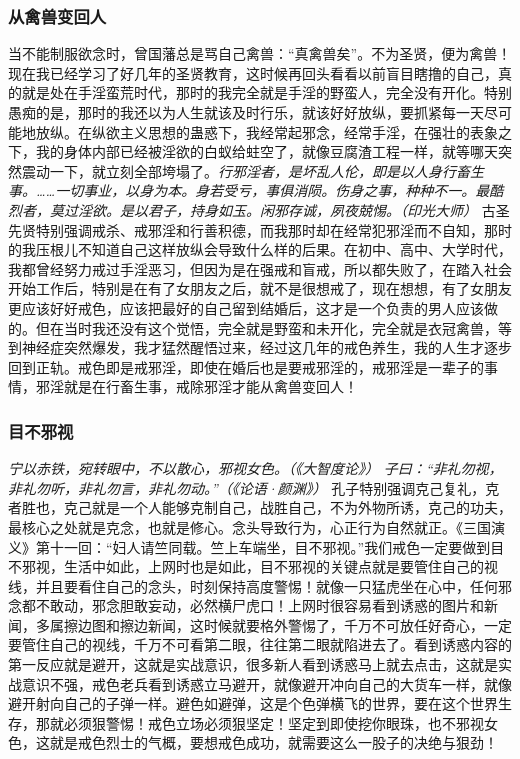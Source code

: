 \subsubsection{从禽兽变回人}

当不能制服欲念时，曾国藩总是骂自己禽兽：“真禽兽矣”。不为圣贤，便为禽兽！现在我已经学习了好几年的圣贤教育，这时候再回头看看以前盲目瞎撸的自己，真的就是处在手淫蛮荒时代，那时的我完全就是手淫的野蛮人，完全没有开化。特别愚痴的是，那时的我还以为人生就该及时行乐，就该好好放纵，要抓紧每一天尽可能地放纵。在纵欲主义思想的蛊惑下，我经常起邪念，经常手淫，在强壮的表象之下，我的身体内部已经被淫欲的白蚁给蛀空了，就像豆腐渣工程一样，就等哪天突然震动一下，就立刻全部垮塌了。\textit{行邪淫者，是坏乱人伦，即是以人身行畜生事。……一切事业，以身为本。身若受亏，事俱消陨。伤身之事，种种不一。最酷烈者，莫过淫欲。是以君子，持身如玉。闲邪存诚，夙夜兢惕。（印光大师）} 古圣先贤特别强调戒杀、戒邪淫和行善积德，而我那时却在经常犯邪淫而不自知，那时的我压根儿不知道自己这样放纵会导致什么样的后果。在初中、高中、大学时代，我都曾经努力戒过手淫恶习，但因为是在强戒和盲戒，所以都失败了，在踏入社会开始工作后，特别是在有了女朋友之后，就不是很想戒了，现在想想，有了女朋友更应该好好戒色，应该把最好的自己留到结婚后，这才是一个负责的男人应该做的。但在当时我还没有这个觉悟，完全就是野蛮和未开化，完全就是衣冠禽兽，等到神经症突然爆发，我才猛然醒悟过来，经过这几年的戒色养生，我的人生才逐步回到正轨。戒色即是戒邪淫，即使在婚后也是要戒邪淫的，戒邪淫是一辈子的事情，邪淫就是在行畜生事，戒除邪淫才能从禽兽变回人！

\subsubsection{目不邪视}

\textit{宁以赤铁，宛转眼中，不以散心，邪视女色。（《大智度论》）} \textit{子曰：“非礼勿视，非礼勿听，非礼勿言，非礼勿动。”（《论语·颜渊》）} 孔子特别强调克己复礼，克者胜也，克己就是一个人能够克制自己，战胜自己，不为外物所诱，克己的功夫，最核心之处就是克念，也就是修心。念头导致行为，心正行为自然就正。《三国演义》第十一回：“妇人请竺同载。竺上车端坐，目不邪视。”我们戒色一定要做到目不邪视，生活中如此，上网时也是如此，目不邪视的关键点就是要管住自己的视线，并且要看住自己的念头，时刻保持高度警惕！就像一只猛虎坐在心中，任何邪念都不敢动，邪念胆敢妄动，必然横尸虎口！上网时很容易看到诱惑的图片和新闻，多属擦边图和擦边新闻，这时候就要格外警惕了，千万不可放任好奇心，一定要管住自己的视线，千万不可看第二眼，往往第二眼就陷进去了。看到诱惑内容的第一反应就是避开，这就是实战意识，很多新人看到诱惑马上就去点击，这就是实战意识不强，戒色老兵看到诱惑立马避开，就像避开冲向自己的大货车一样，就像避开射向自己的子弹一样。避色如避弹，这是个色弹横飞的世界，要在这个世界生存，那就必须狠警惕！戒色立场必须狠坚定！坚定到即使挖你眼珠，也不邪视女色，这就是戒色烈士的气概，要想戒色成功，就需要这么一股子的决绝与狠劲！

